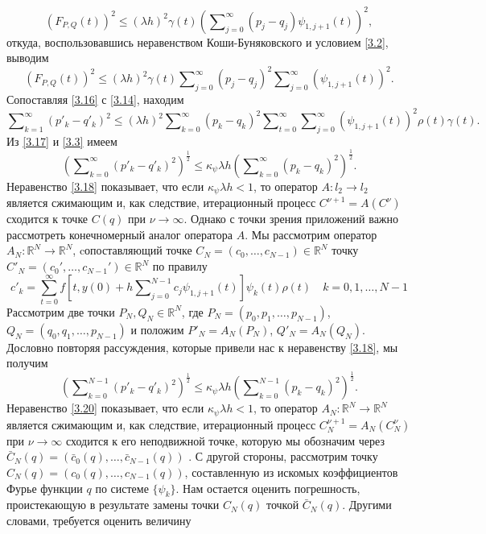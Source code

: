 $$
(F_{P,Q}(t))^2\le (\lambda h)^2\gamma(t) \left(\sum\nolimits_{j=0}^\infty( p_j-q_j)\psi_{1,j+1}(t)\right)^2,
$$
откуда,  воспользовавшись неравенством Коши-Буняковского и условием \eqref{3.2}, выводим
 \begin{equation}\label{3.16}
(F_{P,Q}(t))^2\le(\lambda h)^2 \gamma(t)  \sum\nolimits_{j=0}^\infty( p_j-q_j)^2\sum\nolimits_{j=0}^\infty(\psi_{1,j+1}(t))^2.
\end{equation}
Сопоставляя \eqref{3.16} с \eqref{3.14}, находим
\begin{equation}\label{3.17}
\sum\nolimits_{k=1}^\infty (p'_k-q'_k)^2\le(\lambda h)^2 \sum\nolimits_{k=0}^\infty( p_k-q_k)^2\sum\nolimits_{t=0}^{\infty} \sum\nolimits_{j=0}^\infty(\psi_{1,j+1}(t))^2\rho(t)\gamma(t).
\end{equation}
Из  \eqref{3.17}  и \eqref{3.3} имеем
\begin{equation}\label{3.18}
\left(\sum\nolimits_{k=0}^\infty (p'_k-q'_k)^2\right)^\frac12\le \kappa_\psi\lambda h \left(\sum\nolimits_{k=0}^\infty (p_k-q_k)^2\right)^\frac12. \end{equation}
Неравенство \eqref{3.18} показывает, что если $\kappa_\psi\lambda h<1$, то оператор  $A:l_2\to l_2$ является сжимающим и, как следствие, итерационный процесс $C^{\nu+1}=A(C^{\nu})$  сходится к точке $C(q)$ при $\nu\to\infty$. Однако с точки зрения приложений важно рассмотреть конечномерный аналог оператора $A$. Мы рассмотрим оператор $A_N:\mathbb{R}^N\to \mathbb{R}^N$, cопоставляющий точке
$C_N=(c_0,\ldots,c_{N-1})\in \mathbb{R}^N $ точку  $C'_N=(c_0',\ldots,c_{N-1}')\in \mathbb{R}^N $ по правилу
\begin{equation}\label{3.19}
c'_k=\sum_{t=0}^{\infty} f\left[t,y(0)+h\sum\nolimits_{j=0}^{N-1} c_j\psi_{1,j+1}(t)\right]\psi_{k}(t)\rho(t)\quad k=0,1,\ldots,N-1
\end{equation}
 Рассмотрим две точки $P_N,Q_N\in \mathbb{R}^N$, где $P_N=(p_0,p_1,\ldots,p_{N-1})$,\\   $Q_N=(q_0,q_1,\ldots,p_{N-1})$ и положим $P'_N=A_N(P_N)$, $Q'_N=A_N(Q_N)$. Дословно повторяя рассуждения, которые привели нас к неравенству \eqref{3.18}, мы получим
\begin{equation}\label{3.20}
\left(\sum\nolimits_{k=0}^{N-1} (p'_k-q'_k)^2\right)^\frac12\le \kappa_\psi\lambda h \left(\sum\nolimits_{k=0}^{N-1} (p_k-q_k)^2\right)^\frac12.
\end{equation}
Неравенство \eqref{3.20} показывает, что если $\kappa_\psi\lambda h<1$, то оператор  $A_N:\mathbb{R}^N\to \mathbb{R}^N$ является сжимающим и, как следствие, итерационный процесс $C_N^{\nu+1}=A_N(C_N^{\nu})$  при $\nu\to\infty$ сходится к его неподвижной точке, которую мы обозначим через  $\bar C_N(q)=(\bar c_0(q),\ldots,\bar c_{N-1}(q))$ . С другой стороны, рассмотрим точку $C_N(q)=(c_0(q),\ldots,c_{N-1}(q))$, составленную из искомых коэффициентов Фурье функции $q$ по системе $\{\psi_k\}$. Нам остается оценить погрешность, проистекающую в результате замены точки $C_N(q)$ точкой $\bar C_N(q)$. Другими словами, требуется оценить величину
